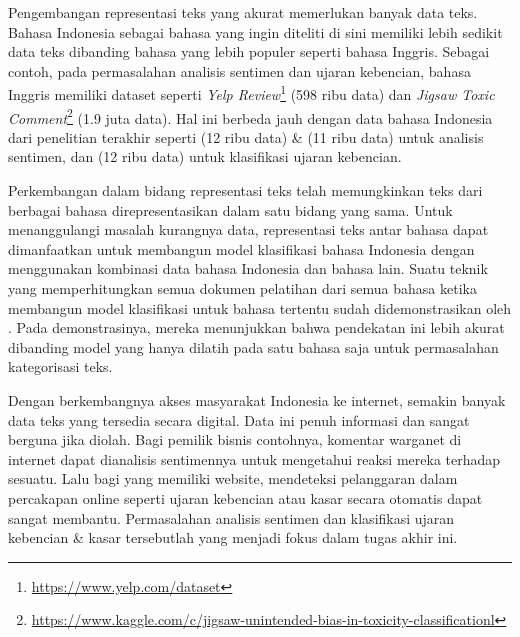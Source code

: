 Pengembangan representasi teks yang akurat memerlukan banyak data teks. Bahasa Indonesia sebagai bahasa yang ingin diteliti di sini memiliki lebih sedikit data teks dibanding bahasa yang lebih populer seperti bahasa Inggris. Sebagai contoh, pada permasalahan analisis sentimen dan ujaran kebencian, bahasa Inggris memiliki dataset seperti \textit{Yelp Review}\footnote{\url{https://www.yelp.com/dataset}} (598 ribu data) dan \textit{Jigsaw Toxic Comment}\footnote{\url{https://www.kaggle.com/c/jigsaw-unintended-bias-in-toxicity-classificationl}} (1.9 juta data). Hal ini berbeda jauh dengan data bahasa Indonesia dari penelitian terakhir seperti \parencite{FarhanKhodra2017} (12 ribu data) \& \parencite{CrisdayantiPurwarianti2019} (11 ribu data) untuk analisis sentimen, dan \parencite{Ibrohim_Budi_2019} (12 ribu data) untuk klasifikasi ujaran kebencian.

Perkembangan dalam bidang representasi teks telah memungkinkan teks dari berbagai bahasa direpresentasikan dalam satu bidang yang sama. Untuk menanggulangi masalah kurangnya data, representasi teks antar bahasa dapat dimanfaatkan untuk membangun model klasifikasi bahasa Indonesia dengan menggunakan kombinasi data bahasa Indonesia dan bahasa lain. Suatu teknik yang memperhitungkan semua dokumen pelatihan dari semua bahasa ketika membangun model klasifikasi untuk bahasa tertentu sudah didemonstrasikan oleh \parencite{Wei_Shi_Yang_2007}. Pada demonstrasinya, mereka menunjukkan bahwa pendekatan ini lebih akurat dibanding model yang hanya dilatih pada satu bahasa saja untuk permasalahan kategorisasi teks. 


Dengan berkembangnya akses masyarakat Indonesia ke internet, semakin banyak data teks yang tersedia secara digital. Data ini penuh informasi dan sangat berguna jika diolah. Bagi pemilik bisnis contohnya, komentar warganet di internet dapat dianalisis sentimennya untuk mengetahui reaksi mereka terhadap sesuatu. Lalu bagi yang memiliki website, mendeteksi pelanggaran dalam percakapan online seperti ujaran kebencian atau kasar secara otomatis dapat sangat membantu. Permasalahan analisis sentimen dan klasifikasi ujaran kebencian \& kasar tersebutlah yang menjadi fokus dalam tugas akhir ini.

